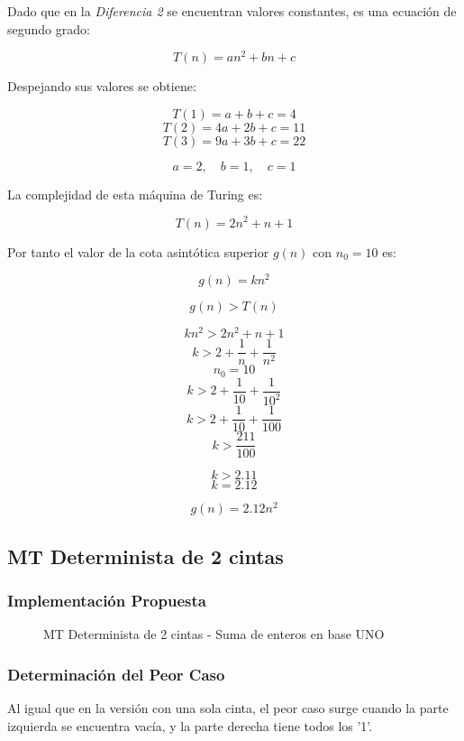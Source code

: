 \documentclass{uc3mpracticas}
\begin{document}
  Dado que en la \textit{Diferencia 2} se encuentran valores constantes, es una ecuación de segundo grado:

  $$ T(n) = an^2 + bn + c $$

  Despejando sus valores se obtiene:

  $$ T(1) = a + b + c = 4 $$
  $$ T(2) = 4a + 2b + c = 11 $$
  $$ T(3) = 9a + 3b + c = 22 $$

  $$ a = 2 ,\quad b = 1 ,\quad c = 1 $$

  La complejidad de esta máquina de Turing es:

  $$ T(n) = 2n^2 + n + 1 $$

  Por tanto el valor de la cota asintótica superior $g(n)$ con $n_0 = 10$ es:

  $$ g(n) = kn^2 $$

  $$ g(n) > T(n) $$

  $$ kn^2 > 2n^2 + n + 1 $$
  $$ k > 2 + \frac{1}{n} + \frac{1}{n^2} $$
  $$ n_0 = 10 $$
  $$ k > 2 + \frac{1}{10} + \frac{1}{10^2} $$
  $$ k > 2 + \frac{1}{10} + \frac{1}{100} $$
  $$ k > \frac{211}{100} $$

  $$ k > 2.11 $$
  $$ k = 2.12 $$

  $$ g(n) = 2.12n^2 $$







  \newpage

  \subsection{MT Determinista de 2 cintas}

  \subsubsection{Implementación Propuesta}


  \begin{figure}[!h]
    \caption{MT Determinista de 2 cintas - Suma de enteros en base UNO}
  \end{figure}


  \subsubsection{Determinación del Peor Caso}

  Al igual que en la versión con una sola cinta, el peor caso surge cuando la parte izquierda se encuentra vacía, y la parte derecha tiene todos los '1'.
\end{document}
